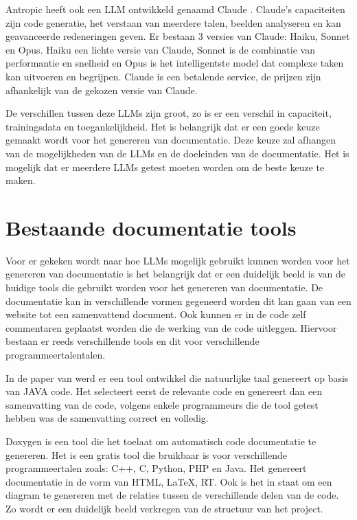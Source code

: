Antropic heeft ook een LLM ontwikkeld genaamd Claude \autocite{Anthropic2023}. 
Claude's capaciteiten zijn code generatie, het verstaan van meerdere talen, beelden analyseren en kan geavanceerde redeneringen geven.
Er bestaan 3 versies van Claude: Haiku, Sonnet en Opus.
Haiku een lichte versie van Claude, Sonnet is de combinatie van performantie en snelheid en Opus is het intelligentste model dat complexe taken kan uitvoeren en begrijpen.
Claude is een betalende service, de prijzen zijn afhankelijk van de gekozen versie van Claude.

De verschillen tussen deze LLMs zijn groot, zo is er een verschil in capaciteit, trainingsdata en toegankelijkheid.
Het is belangrijk dat er een goede keuze gemaakt wordt voor het genereren van documentatie.
Deze keuze zal afhangen van de mogelijkheden van de LLMs en de doeleinden van de documentatie.
Het is mogelijk dat er meerdere LLMs getest moeten worden om de beste keuze te maken.

\section{Bestaande documentatie tools}
\label{sec:huidige-tools}
Voor er gekeken wordt naar hoe LLMs mogelijk gebruikt kunnen worden voor het genereren van documentatie is het belangrijk dat er een duidelijk beeld is van de huidige tools die gebruikt worden voor het genereren van documentatie.
De documentatie kan in verschillende vormen gegeneerd worden dit kan gaan van een website tot een samenvattend document.
Ook kunnen er in de code zelf commentaren geplaatst worden die de werking van de code uitleggen.
Hiervoor bestaan er reeds verschillende tools en dit voor verschillende programmeertalentalen.

In de paper van \textcite{SridharaEtAL2010} werd er een tool ontwikkel die natuurlijke taal genereert op basis van JAVA code. 
Het selecteert eerst de relevante code en genereert dan een samenvatting van de code, volgens enkele programmeurs die de tool getest hebben was de samenvatting correct en volledig.

Doxygen \autocite{Doxygen2023} is een tool die het toelaat om automatisch code documentatie te genereren. Het is een gratis tool die bruikbaar is voor verschillende programmeertalen zoals: C++, C, Python, PHP en Java.
Het genereert documentatie in de vorm van HTML, LaTeX, RT. Ook is het in staat om een diagram te genereren met de relaties tussen de verschillende delen van de code.
Zo wordt er een duidelijk beeld verkregen van de structuur van het project.

